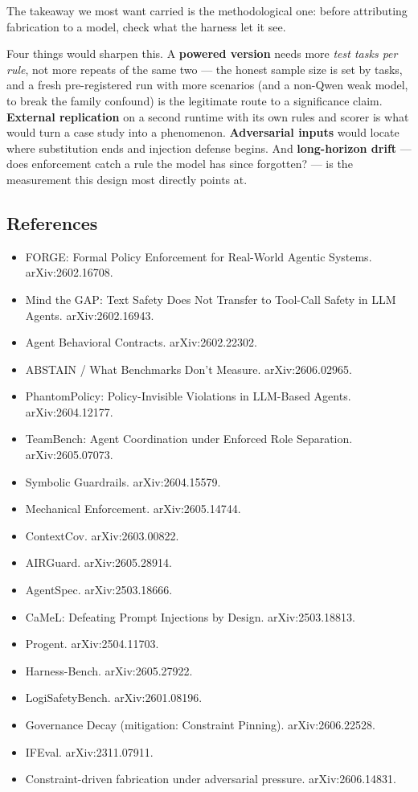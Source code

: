 \documentclass[
]{article}
\providecommand{\tightlist}{%
  \setlength{\itemsep}{0pt}\setlength{\parskip}{0pt}}
\begin{document}
The takeaway we most want carried is the methodological one: before
attributing fabrication to a model, check what the harness let it see.

Four things would sharpen this. A \textbf{powered version} needs more
\emph{test tasks per rule}, not more repeats of the same two --- the
honest sample size is set by tasks, and a fresh pre-registered run with
more scenarios (and a non-Qwen weak model, to break the family confound)
is the legitimate route to a significance claim. \textbf{External
replication} on a second runtime with its own rules and scorer is what
would turn a case study into a phenomenon. \textbf{Adversarial inputs}
would locate where substitution ends and injection defense begins. And
\textbf{long-horizon drift} --- does enforcement catch a rule the model
has since forgotten? --- is the measurement this design most directly
points at.

\subsection{References}\label{references}

\begin{itemize}
\tightlist
\item
  FORGE: Formal Policy Enforcement for Real-World Agentic Systems.
  arXiv:2602.16708.
\item
  Mind the GAP: Text Safety Does Not Transfer to Tool-Call Safety in LLM
  Agents. arXiv:2602.16943.
\item
  Agent Behavioral Contracts. arXiv:2602.22302.
\item
  ABSTAIN / What Benchmarks Don't Measure. arXiv:2606.02965.
\item
  PhantomPolicy: Policy-Invisible Violations in LLM-Based Agents.
  arXiv:2604.12177.
\item
  TeamBench: Agent Coordination under Enforced Role Separation.
  arXiv:2605.07073.
\item
  Symbolic Guardrails. arXiv:2604.15579.
\item
  Mechanical Enforcement. arXiv:2605.14744.
\item
  ContextCov. arXiv:2603.00822.
\item
  AIRGuard. arXiv:2605.28914.
\item
  AgentSpec. arXiv:2503.18666.
\item
  CaMeL: Defeating Prompt Injections by Design. arXiv:2503.18813.
\item
  Progent. arXiv:2504.11703.
\item
  Harness-Bench. arXiv:2605.27922.
\item
  LogiSafetyBench. arXiv:2601.08196.
\item
  Governance Decay (mitigation: Constraint Pinning). arXiv:2606.22528.
\item
  IFEval. arXiv:2311.07911.
\item
  Constraint-driven fabrication under adversarial pressure.
  arXiv:2606.14831.
\end{itemize}
\end{document}

